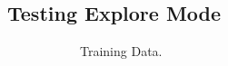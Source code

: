 \subsection{Testing Explore Mode}

\begin{figure}
	\begin{subfigure}[b]{.45\textwidth}
\begin{center}
		\caption{Training Data.}
\end{center}
	\end{subfigure}
\hspace{1cm}
	\begin{subfigure}[b]{.45\textwidth}
\begin{center}

\end{center}
\end{subfigure}
\end{figure}
